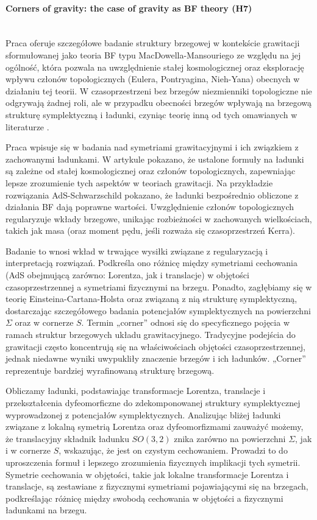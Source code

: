 \documentclass[12pt,a4paper]{article}
\newcommand{\myparagraph}[1]{\paragraph{#1}\mbox{}\\}
\begin{document}
\myparagraph{Corners of gravity: the case of gravity as BF theory (H7)} 

Praca oferuje szczegółowe badanie struktury brzegowej w kontekście grawitacji sformułowanej jako teoria BF typu MacDowella-Mansouriego \cite{Durka:2012wd, Freidel:2005ak} ze względu na jej ogólność, która pozwala na uwzględnienie stałej kosmologicznej oraz eksplorację wpływu członów topologicznych (Eulera, Pontryagina, Nieh-Yana) obecnych w działaniu tej teorii.  W czasoprzestrzeni bez brzegów niezmienniki topologiczne nie odgrywają żadnej roli, ale w przypadku obecności brzegów wpływają na brzegową strukturę symplektyczną i ładunki, czyniąc teorię inną od tych omawianych w literaturze \cite{Freidel:2020xyx}.

Praca wpisuje się w badania nad symetriami grawitacyjnymi i ich związkiem z zachowanymi ładunkami. W artykule pokazano, że ustalone formuły na ładunki są zależne od stałej kosmologicznej oraz członów topologicznych, zapewniając lepsze zrozumienie tych aspektów w teoriach grawitacji. Na przykładzie rozwiązania AdS-Schwarzschild pokazano, że ładunki bezpośrednio obliczone z działania BF dają poprawne wartości. Uwzględnienie członów topologicznych regularyzuje wkłady brzegowe, unikając rozbieżności w zachowanych wielkościach, takich jak masa (oraz moment pędu, jeśli rozważa się czasoprzestrzeń Kerra).

Badanie to wnosi wkład w trwające wysiłki związane z regularyzacją i interpretacją rozwiązań. Podkreśla ono różnicę między symetriami cechowania (AdS obejmującą zarówno: Lorentza, jak i translacje) w objętości czasoprzestrzennej a symetriami fizycznymi na brzegu. Ponadto, zagłębiamy się w teorię Einsteina-Cartana-Holsta oraz związaną z nią strukturę symplektyczną, dostarczając szczegółowego badania potencjałów symplektycznych na powierzchni $\Sigma$ oraz w cornerze $S$. Termin „corner” odnosi się do specyficznego pojęcia w ramach struktur brzegowych układu grawitacyjnego. Tradycyjne podejścia do grawitacji często koncentrują się na właściwościach objętości czasoprzestrzennej, jednak niedawne wyniki uwypukliły znaczenie brzegów i ich ładunków. „Corner” reprezentuje bardziej wyrafinowaną strukturę brzegową.

Obliczamy ładunki, podstawiając transformacje Lorentza, translacje i przekształcenia dyfeomorficzne do zdekomponowanej struktury symplektycznej wyprowadzonej z potencjałów symplektycznych. Analizując bliżej ładunki związane z lokalną symetrią Lorentza oraz dyfeomorfizmami zauważyć możemy, że translacyjny składnik ładunku $SO(3,2)$ znika zarówno na powierzchni $\Sigma$, jak i w cornerze $S$, wskazując, że jest on czystym cechowaniem. Prowadzi to do uproszczenia formuł i lepszego zrozumienia fizycznych implikacji tych symetrii. Symetrie cechowania w objętości, takie jak lokalne transformacje Lorentza i translacje, są zestawiane z fizycznymi symetriami pojawiającymi się na brzegach, podkreślając różnicę między swobodą cechowania w objętości a fizycznymi ładunkami na brzegu.
\end{document}
